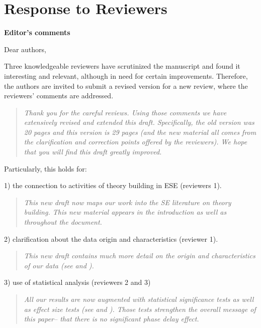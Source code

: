  \section*{Response to Reviewers}

 
{\bf Editor's comments}
 
Dear authors,

Three knowledgeable reviewers have scrutinized the manuscript
and found it interesting and relevant,  although in need for
certain improvements. Therefore, the authors are
 invited to submit a revised version for a new review, where
 the reviewers' comments
are addressed.

\begin{quote} {\em Thank you for the careful reviews. Using
those comments we have extensively revised and extended this draft.
Specifically, the old version was 20 pages and this version is 29 pages (and the new
material all comes from the clarification and correction points offered by the reviewers).
We hope that  you will find this draft greatly improved.}
\end{quote}

Particularly, this holds for:


1) the connection to activities of theory building in ESE
(reviewers 1).  


 

\begin{quote}{\em This new draft now maps our work into the SE literature on theory building. This new material appears in the introduction as well as throughout the document.}\end{quote}
 
2) clarification about the data origin and
characteristics (reviewer 1). 
 

\begin{quote}{\em
This new draft contains much more detail on the origin and characteristics of our data (see  and ).}\end{quote}

3)  use of statistical analysis (reviewers 2 and 3) 

\begin{quote}{\em All our results are now augmented with statistical significance tests as well as effect size tests (see  and ). Those tests strengthen the overall message of this paper-- that there is no significant
phase delay effect.}\end{quote}

